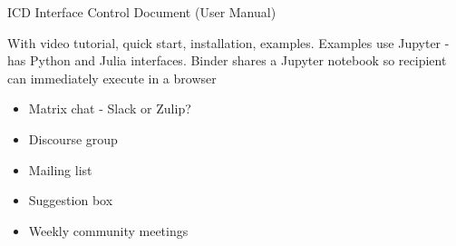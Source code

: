 ICD Interface Control Document (User Manual)

With video tutorial, quick start, installation, examples. %
Examples use Jupyter - has Python and Julia interfaces. Binder shares a Jupyter notebook so
recipient can immediately execute in a browser
\begin{itemize}
\item Matrix chat - Slack or Zulip?
\item Discourse group
\item Mailing list
\item Suggestion box
\item Weekly community meetings
\end{itemize}
